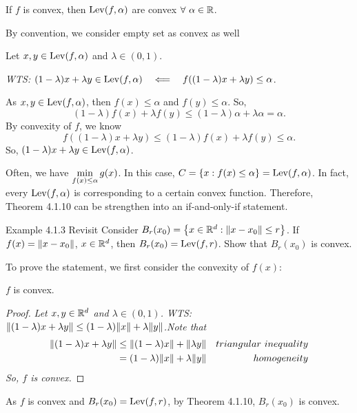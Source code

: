 \begin{thm}{}
	If $f$ is convex, then $\operatorname{Lev}(f,\alpha)$ are convex $\forall\ \alpha\in{\mathbb{R}}$.
\end{thm}
\begin{rmk}
	By convention, we consider empty set as convex as well	
\end{rmk}
\begin{prf}
	Let $x,y\in\operatorname{Lev}(f,\alpha)$ and $\lambda\in(0,1)$. \par \textit{WTS: $(1-\lambda)x+\lambda y\in\operatorname{Lev}(f,\alpha)\quad\Longleftarrow\quad f((1-\lambda)x+\lambda y)\leq\alpha$}.\par As $x,y\in\operatorname{Lev}(f,\alpha)$, then $f(x)\leq\alpha$ and $f(y)\leq\alpha$. So, \[(1-\lambda)f(x)+\lambda f(y)\leq (1-\lambda)\alpha+\lambda\alpha=\alpha.\] By convexity of $f$, we know \[f((1-\lambda)x+\lambda y)\leq(1-\lambda)f(x)+\lambda f(y)\leq\alpha.\] So, $(1-\lambda)x+\lambda y\in\operatorname{Lev}(f,\alpha)$.
\end{prf}
\begin{rmk}
	Often, we have $\displaystyle\min_{f(x)\leq\alpha}g(x)$. In this case, $C=\qty{x:f(x)\leq\alpha}=\operatorname{Lev}(f,\alpha)$. In fact, every $\operatorname{Lev}(f,\alpha)$ is corresponding to a certain convex function. Therefore, Theorem 4.1.10 can be strengthen into an if-and-only-if statement.
\end{rmk}
\begin{eg}{Example 4.1.3 Revisit}
	Consider $B_r(x_0)=\qty{x\in{\mathbb{R}}^d:\norm{x-x_0}\leq r}$. If $f(x)=\norm{x-x_0}$, $x\in{\mathbb{R}}^d$, then $B_r(x_0)=\operatorname{Lev}(f,r)$. Show that $B_r(x_0)$ is convex. 
	\begin{prf}
		To prove the statement, we first consider the convexity of $f(x)$: 
		\begin{clm*}
			$f$ is convex.
		\end{clm*}
		\begin{proof}\textit{
			Let $x,y\in{\mathbb{R}}^d$ and $\lambda\in(0,1)$. WTS: $\norm{(1-\lambda)x+\lambda y}\leq(1-\lambda)\norm{x}+\lambda\norm{y}$.\newline Note that \begin{align*}
			\norm{(1-\lambda)x+\lambda y}&\leq\norm{(1-\lambda)x}+\norm{\lambda y}&triangular\ inequality\\&=(1-\lambda)\norm{x}+\lambda\norm{y}&homogeneity\end{align*} So, $f$ is convex.} 
		\end{proof}
		As $f$ is convex and $B_r(x_0)=\operatorname{Lev}(f,r)$, by Theorem 4.1.10, $B_r(x_0)$ is convex. 
	\end{prf}
\end{eg}
